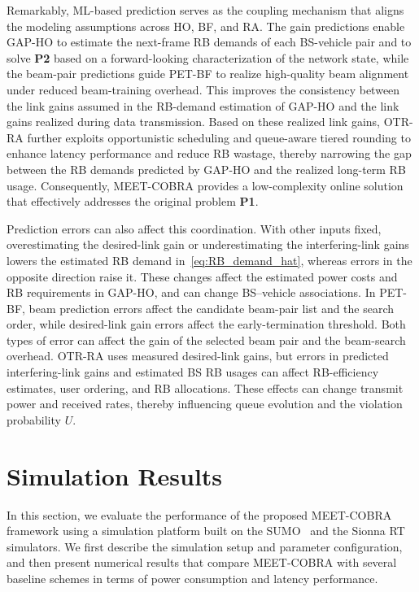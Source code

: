 \documentclass[conference, a4paper]{IEEEtran}
\newcommand{\rev}[1]{\textcolor{revisioncolor}{{}#1}}
\theoremstyle{remark}
\begin{document}
Remarkably, ML-based prediction serves as the coupling mechanism that aligns the modeling assumptions across HO, BF, and RA. The gain predictions enable GAP-HO to estimate the next-frame RB demands of each BS-vehicle pair and to solve \textbf{P2} based on a forward-looking characterization of the network state, while the beam-pair predictions guide PET-BF to realize high-quality beam alignment under reduced beam-training overhead. This improves the consistency between the link gains assumed in the RB-demand estimation of GAP-HO and the link gains realized during data transmission. Based on these realized link gains, OTR-RA further exploits opportunistic scheduling and queue-aware tiered rounding to enhance latency performance and reduce RB wastage, thereby narrowing the gap between the RB demands predicted by GAP-HO and the realized long-term RB usage. Consequently, MEET-COBRA provides a low-complexity online solution that effectively addresses the original problem \textbf{P1}.


\rev{Prediction errors can also affect this coordination. With other inputs fixed, overestimating the desired-link gain or underestimating the interfering-link gains lowers the estimated RB demand in~\eqref{eq:RB_demand_hat}, whereas errors in the opposite direction raise it. These changes affect the estimated power costs and RB requirements in GAP-HO, and can change BS--vehicle associations. In PET-BF, beam prediction errors affect the candidate beam-pair list and the search order, while desired-link gain errors affect the early-termination threshold. Both types of error can affect the gain of the selected beam pair and the beam-search overhead. OTR-RA uses measured desired-link gains, but errors in predicted interfering-link gains and estimated BS RB usages can affect RB-efficiency estimates, user ordering, and RB allocations. These effects can change transmit power and received rates, thereby influencing queue evolution and the violation probability $U$.}

\section{Simulation Results}

In this section, we evaluate the performance of the proposed MEET-COBRA framework using a simulation platform built on the SUMO~\cite{behrisch2011sumo} and the Sionna RT~\cite{sionnaRT} simulators.
We first describe the simulation setup and parameter configuration, and then present numerical results that compare MEET-COBRA with several baseline schemes in terms of power consumption and latency performance.
\end{document}
